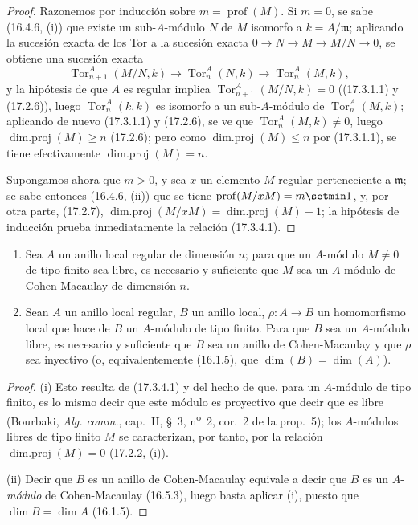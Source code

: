 \begin{proof}
Razonemos por inducción sobre $m=\operatorname{prof}(M)$. Si $m=0$, se sabe
(16.4.6, (i)) que existe un sub-$A$-módulo $N$ de $M$ isomorfo a
$k=A/\mathfrak{m}$; aplicando la sucesión exacta de los Tor a la sucesión
exacta $0\longrightarrow N\longrightarrow M\longrightarrow M/N\longrightarrow0$,
se obtiene una sucesión exacta
\[
  \operatorname{Tor}^A_{n+1}(M/N,k)\longrightarrow
  \operatorname{Tor}^A_n(N,k)\longrightarrow
  \operatorname{Tor}^A_n(M,k),
\]
y la hipótesis de que $A$ es regular implica
$\operatorname{Tor}^A_{n+1}(M/N,k)=0$ ((17.3.1.1) y (17.2.6)), luego
$\operatorname{Tor}^A_n(k,k)$ es isomorfo a un sub-$A$-módulo de
$\operatorname{Tor}^A_n(M,k)$; aplicando de nuevo (17.3.1.1) y (17.2.6), se
ve que $\operatorname{Tor}^A_n(M,k)\neq0$, luego
$\operatorname{dim.proj}(M)\geq n$ (17.2.6); pero como
$\operatorname{dim.proj}(M)\leq n$ por (17.3.1.1), se tiene efectivamente
$\operatorname{dim.proj}(M)=n$.

Supongamos ahora que $m>0$, y sea $x$ un elemento $M$-regular perteneciente a
$\mathfrak{m}$; se sabe entonces (16.4.6, (ii)) que se tiene
$\operatorname{prof}(M/xM)=m\setmin 1$, y, por otra parte, (17.2.7),
$\operatorname{dim.proj}(M/xM)=\operatorname{dim.proj}(M)+1$; la hipótesis de
inducción prueba inmediatamente la relación (17.3.4.1).
\end{proof}


\begin{corollary}[17.3.5]
\label{0.17.3.5-fr}
\begin{enumerate}
  \item[\rm(i)] Sea $A$ un anillo local regular de dimensión $n$; para que un
  $A$-módulo $M\neq0$ de tipo finito sea libre, es necesario y suficiente que
  $M$ sea un $A$-módulo de Cohen-Macaulay de dimensión $n$.
  \item[\rm(ii)] Sean $A$ un anillo local regular, $B$ un anillo local,
  $\rho:A\to B$ un homomorfismo local que hace de $B$ un $A$-módulo de tipo
  finito. Para que $B$ sea un $A$-módulo libre, es necesario y suficiente que
  $B$ sea un anillo de Cohen-Macaulay y que $\rho$ sea inyectivo \textup{(o,
  equivalentemente (16.1.5), que $\dim(B)=\dim(A)$)}.
\end{enumerate}
\end{corollary}

\begin{proof}
(i) Esto resulta de (17.3.4.1) y del hecho de que, para un $A$-módulo de tipo
finito, es lo mismo decir que este módulo es proyectivo que decir que es libre
(Bourbaki, \emph{Alg. comm.}, cap.~II, \S~3, n\textsuperscript{o}~2, cor.~2 de
la prop.~5); los $A$-módulos libres de tipo finito $M$ se caracterizan, por
tanto, por la relación $\operatorname{dim.proj}(M)=0$ (17.2.2, (i)).

(ii) Decir que $B$ es un anillo de Cohen-Macaulay equivale a decir que $B$ es
un $A$-\emph{módulo} de Cohen-Macaulay (16.5.3), luego basta aplicar (i), puesto que
$\dim B=\dim A$ (16.1.5).
\end{proof}

